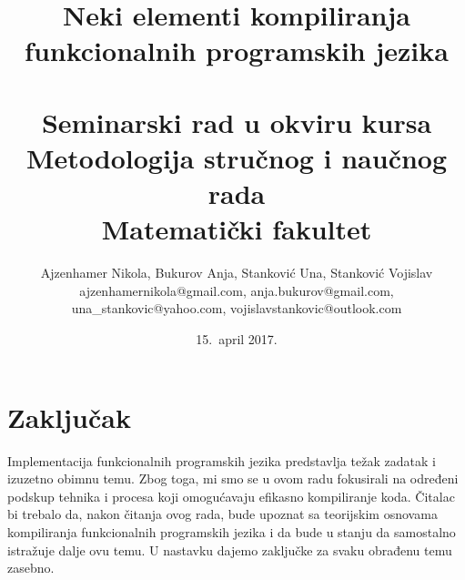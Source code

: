 \documentclass[a4paper]{article}
\begin{document}
\title{Neki elementi kompiliranja funkcionalnih programskih jezika\\ \small{~\\Seminarski rad u okviru kursa\\Metodologija stručnog i naučnog rada\\ Matematički fakultet}}

\author{
	Ajzenhamer Nikola, Bukurov Anja, Stanković Una, Stanković Vojislav\\
	ajzenhamernikola@gmail.com, anja.bukurov@gmail.com,\\
	una\_stankovic@yahoo.com, vojislavstankovic@outlook.com
	}
\date{15.~april 2017.}
\maketitle


\tableofcontents

\newpage









\section{Zaključak}
\label{sec:zakljucak}

Implementacija funkcionalnih programskih jezika predstavlja težak zadatak i izuzetno obimnu temu. Zbog toga, mi smo se u ovom radu fokusirali na određeni podskup tehnika i procesa koji omogućavaju efikasno kompiliranje koda. Čitalac bi trebalo da, nakon čitanja ovog rada, bude upoznat sa teorijskim osnovama kompiliranja funkcionalnih programskih jezika i da bude u stanju da samostalno istražuje dalje ovu temu. U nastavku dajemo zaključke za svaku obrađenu temu zasebno.
\end{document}
